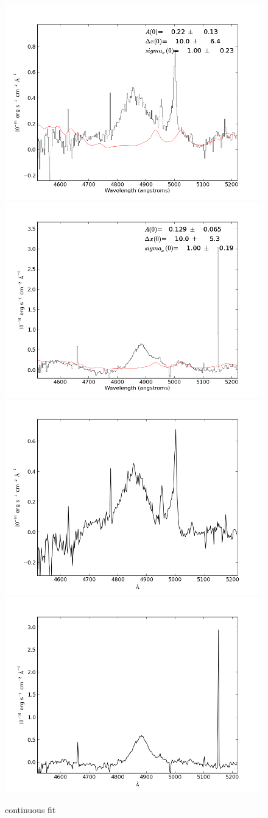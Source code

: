 \documentclass[usenatbib]{mn2e}
\begin{document}
\newpage

\begin{figure}
\begin{center}
\includegraphics[width=0.46\linewidth,angle=0]{fe_fit_Hbeta_2.png}
\vspace{5mm}
\includegraphics[width=0.49\linewidth,angle=0]{fe_fit_Hbeta_3.png}\\
\includegraphics[width=0.46\linewidth,angle=0]{fe_fit_Hbeta_res_2.png}
\hspace{5mm}
\includegraphics[width=0.49\linewidth,angle=0]{fe_fit_Hbeta_res_3.png}\\
\end{center} 
\caption{continuous fit \label{fig:landscape}}   
\end{figure}
\end{document}
